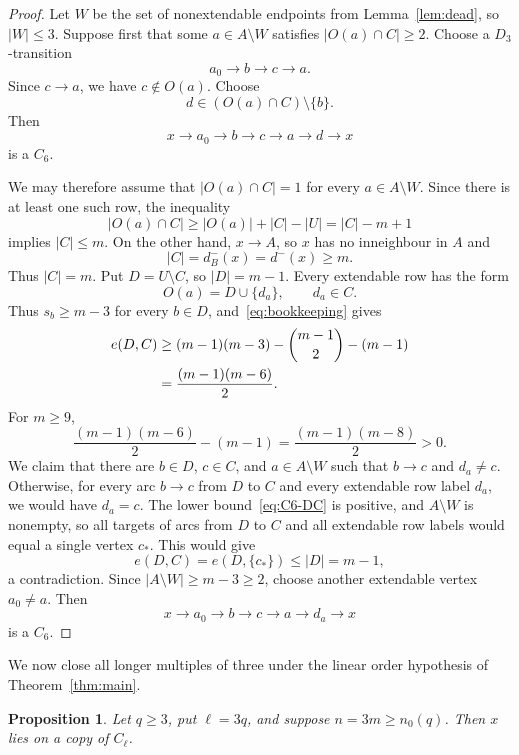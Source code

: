 \documentclass[11pt]{amsart}
\newtheorem{proposition}[theorem]{Proposition}
\theoremstyle{definition}
\begin{document}
\begin{proof}
Let $W$ be the set of nonextendable endpoints from Lemma~\ref{lem:dead}, so $|W|\le3$.  Suppose first that some $a\in A\setminus W$ satisfies $|O(a)\cap C|\ge2$.  Choose a $D_3$-transition
\[
  a_0\to b\to c\to a.
\]
Since $c\to a$, we have $c\notin O(a)$.  Choose
\[
  d\in (O(a)\cap C)\setminus\{b\}.
\]
Then
\[
  x\to a_0\to b\to c\to a\to d\to x
\]
is a $C_6$.

We may therefore assume that $|O(a)\cap C|=1$ for every $a\in A\setminus W$.  Since there is at least one such row, the inequality
\[
  |O(a)\cap C|\ge |O(a)|+|C|-|U|=|C|-m+1
\]
implies $|C|\le m$.  On the other hand, $x\to A$, so $x$ has no
inneighbour in $A$ and
\[
  |C|=d_B^-(x)=d^-(x)\ge m.
\]
Thus $|C|=m$.  Put $D=U\setminus C$, so $|D|=m-1$.  Every extendable row has the form
\[
  O(a)=D\cup\{d_a\},\qquad d_a\in C.
\]
Thus $s_b\ge m-3$ for every $b\in D$, and~\eqref{eq:bookkeeping} gives
\begin{align}
e(D,C)
&\ge (m-1)(m-3)-\binom{m-1}{2}-(m-1)\notag\\
&=\frac{(m-1)(m-6)}2.\label{eq:C6-DC}
\end{align}
For $m\ge9$,
\[
  \frac{(m-1)(m-6)}2-(m-1)
  =\frac{(m-1)(m-8)}2>0.
\]
We claim that there are $b\in D$, $c\in C$, and $a\in A\setminus W$ such that
$b\to c$ and $d_a\ne c$.  Otherwise, for every arc $b\to c$ from
$D$ to $C$ and every extendable row label $d_a$, we would have
$d_a=c$.  The lower bound~\eqref{eq:C6-DC} is positive, and
$A\setminus W$ is nonempty, so all targets of arcs from $D$ to $C$
and all extendable row labels would equal a single vertex $c_*$.  This
would give
\[
  e(D,C)=e(D,\{c_*\})\le |D|=m-1,
\]
a contradiction.  Since $|A\setminus W|\ge m-3\ge2$, choose another
extendable vertex $a_0\ne a$.  Then
\[
  x\to a_0\to b\to c\to a\to d_a\to x
\]
is a $C_6$.
\end{proof}

We now close all longer multiples of three under the linear order
hypothesis of Theorem~\ref{thm:main}.

\begin{proposition}\label{prop:first-port}
Let $q\ge3$, put $\ell=3q$, and suppose $n=3m\ge n_0(q)$.
Then $x$ lies on a copy of $C_\ell$.
\end{proposition}
\end{document}
